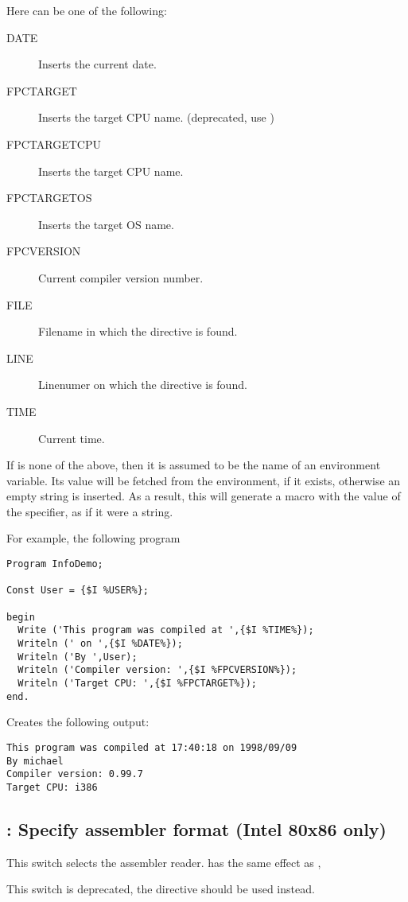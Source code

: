 Here  can be one of the following:
\begin{description}
\item[DATE] Inserts the current date.
\item[FPCTARGET] Inserts the target CPU name. (deprecated, use
)
\item[FPCTARGETCPU] Inserts the target CPU name.
\item[FPCTARGETOS] Inserts the target OS name.
\item[FPCVERSION] Current compiler version number.
\item[FILE] Filename in which the directive is found.
\item[LINE] Linenumer on which the directive is found.
\item[TIME] Current time.
\end{description}
If  is none of the above, then it is assumed to be the name of
an environment variable. Its value will be fetched from the environment,
if it exists, otherwise an empty string is inserted.
As a result, this will generate a macro with the value of the 
specifier, as if it were a string.

For example, the following program
\begin{verbatim}
Program InfoDemo;

Const User = {$I %USER%};

begin
  Write ('This program was compiled at ',{$I %TIME%});
  Writeln (' on ',{$I %DATE%});
  Writeln ('By ',User);
  Writeln ('Compiler version: ',{$I %FPCVERSION%});
  Writeln ('Target CPU: ',{$I %FPCTARGET%});
end.
\end{verbatim}
Creates the following output:
\begin{verbatim}
This program was compiled at 17:40:18 on 1998/09/09
By michael
Compiler version: 0.99.7
Target CPU: i386
\end{verbatim}

\subsection{ : Specify assembler format (Intel 80x86 only)}

This switch selects the assembler reader. 
has the same effect as , 

This switch is deprecated, the  directive should
be used instead.

